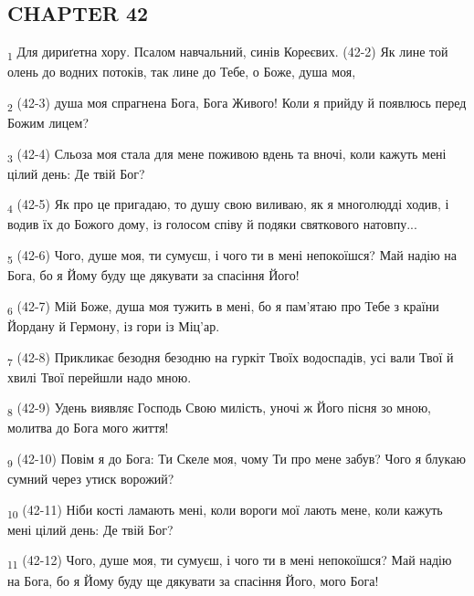 \subsection{CHAPTER 42}
\begin{tcolorbox}
\textsubscript{1} Для дириґетна хору. Псалом навчальний, синів Кореєвих. (42-2) Як лине той олень до водних потоків, так лине до Тебе, о Боже, душа моя,
\end{tcolorbox}
\begin{tcolorbox}
\textsubscript{2} (42-3) душа моя спрагнена Бога, Бога Живого! Коли я прийду й появлюсь перед Божим лицем?
\end{tcolorbox}
\begin{tcolorbox}
\textsubscript{3} (42-4) Сльоза моя стала для мене поживою вдень та вночі, коли кажуть мені цілий день: Де твій Бог?
\end{tcolorbox}
\begin{tcolorbox}
\textsubscript{4} (42-5) Як про це пригадаю, то душу свою виливаю, як я многолюдді ходив, і водив їх до Божого дому, із голосом співу й подяки святкового натовпу...
\end{tcolorbox}
\begin{tcolorbox}
\textsubscript{5} (42-6) Чого, душе моя, ти сумуєш, і чого ти в мені непокоїшся? Май надію на Бога, бо я Йому буду ще дякувати за спасіння Його!
\end{tcolorbox}
\begin{tcolorbox}
\textsubscript{6} (42-7) Мій Боже, душа моя тужить в мені, бо я пам'ятаю про Тебе з країни Йордану й Гермону, із гори із Міц'ар.
\end{tcolorbox}
\begin{tcolorbox}
\textsubscript{7} (42-8) Прикликає безодня безодню на гуркіт Твоїх водоспадів, усі вали Твої й хвилі Твої перейшли надо мною.
\end{tcolorbox}
\begin{tcolorbox}
\textsubscript{8} (42-9) Удень виявляє Господь Свою милість, уночі ж Його пісня зо мною, молитва до Бога мого життя!
\end{tcolorbox}
\begin{tcolorbox}
\textsubscript{9} (42-10) Повім я до Бога: Ти Скеле моя, чому Ти про мене забув? Чого я блукаю сумний через утиск ворожий?
\end{tcolorbox}
\begin{tcolorbox}
\textsubscript{10} (42-11) Ніби кості ламають мені, коли вороги мої лають мене, коли кажуть мені цілий день: Де твій Бог?
\end{tcolorbox}
\begin{tcolorbox}
\textsubscript{11} (42-12) Чого, душе моя, ти сумуєш, і чого ти в мені непокоїшся? Май надію на Бога, бо я Йому буду ще дякувати за спасіння Його, мого Бога!
\end{tcolorbox}
